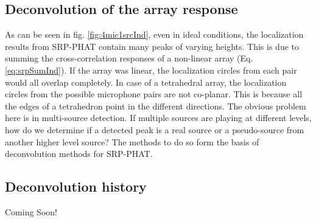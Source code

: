 \subsection{Deconvolution of the array response}

As can be seen in fig. \ref{fig:4mic1srcInd}, even in ideal conditions, the localization results from SRP-PHAT contain many peaks of varying heights. This is due to summing the cross-correlation responses of a non-linear array (Eq. \ref{eq:srpSumInd}). If the array was linear, the localization circles from each pair would all overlap completely. In case of a tetrahedral array, the localization circles from the possible microphone pairs are not co-planar. This is because all the edges of a tetrahedron point in the different directions. The obvious problem here is in multi-source detection. If multiple sources are playing at different levels, how do we determine if a detected peak is a real source or a pseudo-source from another higher level source? The methods to do so form the basis of deconvolution methods for SRP-PHAT.

\subsection{Deconvolution history}
Coming Soon!
\newpage
